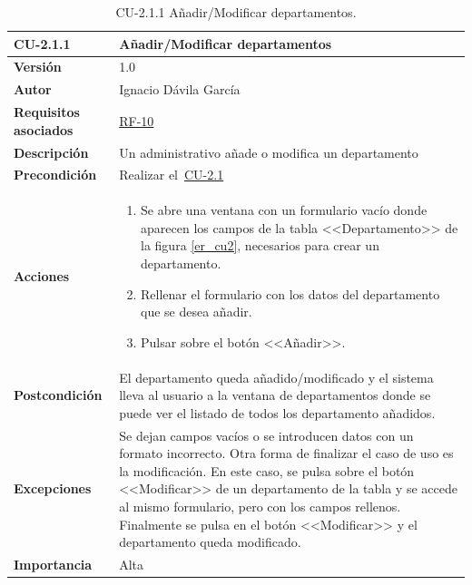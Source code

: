 \begin{table}[p]
\label{table:CU-2.1.1}
	\centering
	\begin{tabularx}{\linewidth}{ p{} p{} }
		\toprule
		\textbf{CU-2.1.1}    & \textbf{Añadir/Modificar departamentos}\\
		\toprule
		\textbf{Versión}              & 1.0    \\
		\textbf{Autor}                & Ignacio Dávila García \\
		\textbf{Requisitos asociados} & \hyperref[itm:RF10]{RF-10} \\
		\textbf{Descripción}          & Un administrativo añade o modifica un departamento \\
		\textbf{Precondición}         & Realizar el~\hyperref[table:CU-2.1]{CU-2.1} \\
		\textbf{Acciones}             &
		\begin{enumerate}
			\def\labelenumi{\arabic{enumi}.}
			\tightlist
			\item Se abre una ventana con un formulario vacío donde aparecen los campos de la tabla <<Departamento>> de la figura \ref{er_cu2}, necesarios para crear un departamento.
			\item Rellenar el formulario con los datos del departamento que se desea añadir.
			\item Pulsar sobre el botón <<Añadir>>.
		\end{enumerate}\\
		\textbf{Postcondición}        & El departamento queda añadido/modificado y el sistema lleva al usuario a la ventana de departamentos donde se puede ver el listado de todos los departamento añadidos. \\
		\textbf{Excepciones}          & Se dejan campos vacíos o se introducen datos con un formato incorrecto. Otra forma de finalizar el caso de uso es la modificación. En este caso, se pulsa sobre el botón <<Modificar>> de un departamento de la tabla y se accede al mismo formulario, pero con los campos rellenos. Finalmente se pulsa en el botón <<Modificar>> y el departamento queda modificado. \\
		\textbf{Importancia}          & Alta \\
		\bottomrule
	\end{tabularx}
	\caption{CU-2.1.1 Añadir/Modificar departamentos.}
\end{table}
\FloatBarrier

